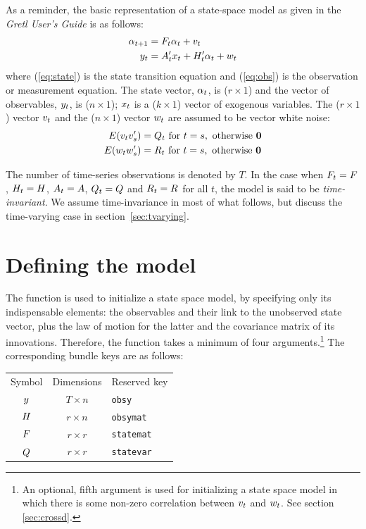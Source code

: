 \documentclass[a4paper]{article}
\begin{document}
As a reminder, the basic representation of a state-space model as
given in the \textit{Gretl User's Guide} is as follows:
%
\begin{align}
  \label{eq:state}
  \alpha_{t+1} &= F_t \alpha_t + v_t \\
  \label{eq:obs}
  y_t &= A_t'x_t + H_t' \alpha_t +
  w_t 
\end{align}
%
where (\ref{eq:state}) is the state transition equation and
(\ref{eq:obs}) is the observation or measurement equation.  The state
vector, $\alpha_{t}$, is ($r \times 1$) and the vector of
observables, $y_t$, is ($n \times 1$); $x_t$ is a ($k
\times 1$) vector of exogenous variables.  The ($r \times 1$) vector
$v_t$ and the ($n \times 1$) vector $w_t$ are assumed to
be vector white noise:
%
\begin{align*}
E(v_t v_s') &= Q_t \mbox{ for } t = s, 
    \mbox{ otherwise } \mathbf{0} \\
E(w_t w_s') &= R_t \mbox{ for } t = s, 
    \mbox{ otherwise } \mathbf{0}
\end{align*}

The number of time-series observations is denoted by $T$.  In the case
when $F_t = F$, $H_t = H$,
$A_t = A$, $Q_t = Q$ and
$R_t = R$ for all $t$, the model is said to be
\emph{time-invariant}. We assume time-invariance in most of what
follows, but discuss the time-varying case in
section~\ref{sec:tvarying}.

\section{Defining the model}
\label{sec:setup}

The  function is used to initialize a state space
model, by specifying only its indispensable elements: the observables
and their link to the unobserved state vector, plus the law of motion
for the latter and the covariance matrix of its
innovations. Therefore, the function takes a minimum of four
arguments.\footnote{An optional, fifth argument is used for
  initializing a state space model in which there is some non-zero
  correlation between $v_t$ and $w_t$. See section
  \ref{sec:crossd}.} The corresponding bundle keys are as follows:

\begin{center}
\begin{tabular}{ccl}
Symbol & Dimensions & Reserved key \\[6pt]
$y$      & $T \times n$ & \texttt{obsy}\\
$H$      & $r \times n$ & \texttt{obsymat}\\
$F$    & $r \times r$ & \texttt{statemat}\\
$Q$      & $r \times r$ & \texttt{statevar}\\
\end{tabular}
\end{center}
\end{document}
